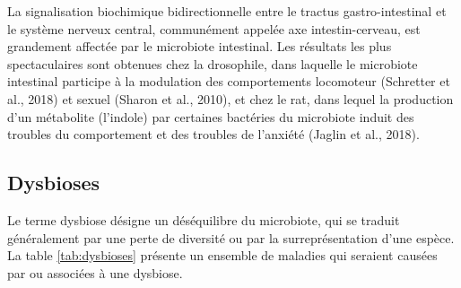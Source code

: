 \documentclass[12pt,a4paper]{reedthesis}
\theoremstyle{definition}
\theoremstyle{definition}
\theoremstyle{definition}
\theoremstyle{remark}
\begin{document}
La signalisation biochimique bidirectionnelle entre le tractus gastro-intestinal et le système nerveux central, communément appelée axe intestin-cerveau, est grandement affectée par le microbiote intestinal. Les résultats les plus spectaculaires sont obtenues chez la drosophile, dans laquelle le microbiote intestinal participe à la modulation des comportements locomoteur (Schretter et al., 2018) et sexuel (Sharon et al., 2010), et chez le rat, dans lequel la production d'un métabolite (l'indole) par certaines bactéries du microbiote induit des troubles du comportement et des troubles de l'anxiété (Jaglin et al., 2018).

\hypertarget{dysbioses}{%
\subsection{Dysbioses}\label{dysbioses}}

Le terme dysbiose désigne un déséquilibre du microbiote, qui se traduit généralement par une perte de diversité ou par la surreprésentation d'une espèce. La table \ref{tab:dysbioses} présente un ensemble de maladies qui seraient causées par ou associées à une dysbiose.
\end{document}
